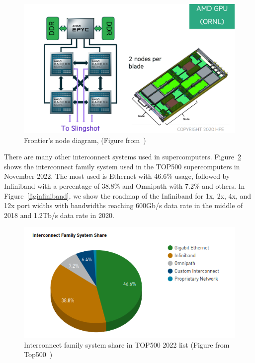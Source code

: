 \begin{figure}[tb]\centering
\includegraphics[scale=0.25]{figures/frontier_node_diagram_lr.png}
\caption{Frontier's node diagram, (Figure from~\cite{frontier})}
\label{figfrontierdiag}
\end{figure}

There are many other interconnect systems used in supercomputers. Figure~\ref{figinterconnect} shows the interconnect family system used in the TOP500 supercomputers in November 2022. The most used is Ethernet with 46.6\% usage, followed by Infiniband with a percentage of 38.8\% and Omnipath with 7.2\% and others. In Figure~\ref{figinfiniband}, we show the roadmap of the Infiniband for 1x, 2x, 4x, and 12x port widths with bandwidths reaching 600Gb/s data rate in the middle of 2018 and 1.2Tb/s data rate in 2020.

\begin{figure}[hb]\centering
\includegraphics[scale=0.5]{figures/interconnect.png}
\caption{Interconnect family system share in TOP500 2022 list (Figure from Top500~\cite{top500})}
\label{figinterconnect}
\end{figure}


